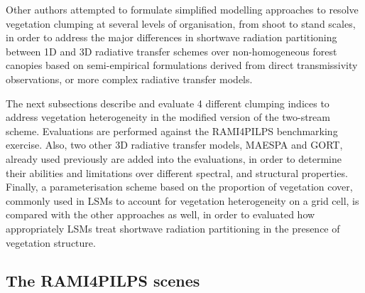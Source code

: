 \documentclass[a4paper,11pt]{report}
\begin{document}


Other authors \citep{Kucharik1999,Ni-Meister2010} attempted to formulate simplified modelling approaches to resolve vegetation clumping at several levels of organisation, from shoot to stand scales, in order to address the major differences in shortwave radiation partitioning between 1D and 3D radiative transfer schemes over non-homogeneous forest canopies based on semi-empirical formulations derived from direct transmissivity observations, or more complex radiative transfer models.

The next subsections describe and evaluate 4 different clumping indices to address vegetation heterogeneity in the modified version of the two-stream scheme. Evaluations are performed against the RAMI4PILPS \citep{Widlowski2011} benchmarking exercise. Also, two other 3D radiative transfer models, MAESPA and GORT, already used previously are added into the evaluations, in order to determine their abilities and limitations over different spectral, and structural properties. Finally, a parameterisation scheme based on the proportion of vegetation cover, commonly used in LSMs to account for vegetation heterogeneity on a grid cell, is compared with the other approaches as well, in order to evaluated how appropriately LSMs treat shortwave radiation partitioning in the presence of vegetation structure.

\subsection{The RAMI4PILPS scenes}
\end{document}
